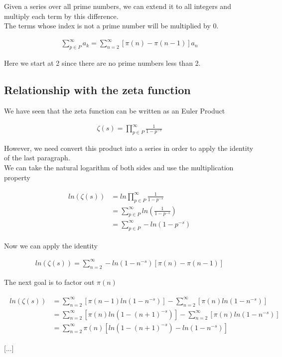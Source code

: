 \documentclass{article}
\begin{document}
Given a series over all prime numbers, we can extend it to all integers and multiply each term by this difference.
\\
The terms whose index is not a prime number will be multiplied by 0.

\begin{align*}
    \sum_{p\in P}^{\infty}a_k=\sum_{n=2}^{\infty}\left[\pi (n) - \pi (n-1)\right]a_n
\end{align*}

Here we start at 2 since there are no prime numbers less than 2.

\subsection{Relationship with the zeta function}

We have seen that the zeta function can be written as an Euler Product

\begin{align*}
    \zeta (s)=\prod_{p\in P}^{\infty}\frac{1}{1-p^{-s}}
\end{align*}

However, we need convert this product into a series in order to apply the identity of the last paragraph.
\\
We can take the natural logarithm of both sides and use the multiplication property

\begin{align*}
    \begin{split}
        ln\left(\zeta (s)\right)&=ln\prod_{p\in P}^{\infty}\frac{1}{1-p^{-s}}
        \\
        &=\sum_{p\in P}^{\infty}ln\left(\frac{1}{1-p^{-s}}\right)
        \\
        &=\sum_{p\in P}^{\infty}-ln\left(1-p^{-s}\right)
    \end{split}
\end{align*}

Now we can apply the identity

\begin{align*}
    ln\left(\zeta (s)\right)=\sum_{n=2}^{\infty}-ln\left(1-n^{-s}\right)\left[\pi (n) - \pi (n-1)\right]
\end{align*}

The next goal is to factor out $\pi (n)$

\begin{align*}
    \begin{split}
        ln\left(\zeta (s)\right)&=\sum_{n=2}^{\infty}\left[\pi (n-1)ln\left(1-n^{-s}\right)\right]
        -\sum_{n=2}^{\infty}\left[\pi (n)ln\left(1-n^{-s}\right)\right]
        \\&=\sum_{n=2}^{\infty}\left[\pi (n)ln\left(1-(n+1)^{-s}\right)\right]
        -\sum_{n=2}^{\infty}\left[\pi (n)ln\left(1-n^{-s}\right)\right]
        \\
        &=\sum_{n=2}^{\infty}\pi (n)\left[ln\left(1-(n+1)^{-s}\right)-ln\left(1-n^{-s}\right)\right]
    \end{split}
\end{align*}

[...]
\end{document}
